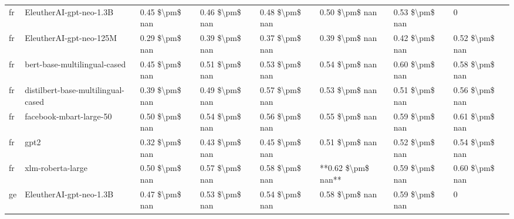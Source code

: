 \begin{tabular}{llllllll}
      fr &            EleutherAI-gpt-neo-1.3B & 0.45 \$\textbackslash pm\$ nan &            0.46 \$\textbackslash pm\$ nan &        0.48 \$\textbackslash pm\$ nan &         0.50 \$\textbackslash pm\$ nan &                          0.53 \$\textbackslash pm\$ nan &                  0 \\
      fr &            EleutherAI-gpt-neo-125M & 0.29 \$\textbackslash pm\$ nan &            0.39 \$\textbackslash pm\$ nan &        0.37 \$\textbackslash pm\$ nan &         0.39 \$\textbackslash pm\$ nan &                          0.42 \$\textbackslash pm\$ nan &     0.52 \$\textbackslash pm\$ nan \\
      fr &       bert-base-multilingual-cased & 0.45 \$\textbackslash pm\$ nan &            0.51 \$\textbackslash pm\$ nan &        0.53 \$\textbackslash pm\$ nan &         0.54 \$\textbackslash pm\$ nan &                          0.60 \$\textbackslash pm\$ nan &     0.58 \$\textbackslash pm\$ nan \\
      fr & distilbert-base-multilingual-cased & 0.39 \$\textbackslash pm\$ nan &            0.49 \$\textbackslash pm\$ nan &        0.57 \$\textbackslash pm\$ nan &         0.53 \$\textbackslash pm\$ nan &                          0.51 \$\textbackslash pm\$ nan &     0.56 \$\textbackslash pm\$ nan \\
      fr &            facebook-mbart-large-50 & 0.50 \$\textbackslash pm\$ nan &            0.54 \$\textbackslash pm\$ nan &        0.56 \$\textbackslash pm\$ nan &         0.55 \$\textbackslash pm\$ nan &                          0.59 \$\textbackslash pm\$ nan &     0.61 \$\textbackslash pm\$ nan \\
      fr &                               gpt2 & 0.32 \$\textbackslash pm\$ nan &            0.43 \$\textbackslash pm\$ nan &        0.45 \$\textbackslash pm\$ nan &         0.51 \$\textbackslash pm\$ nan &                          0.52 \$\textbackslash pm\$ nan &     0.54 \$\textbackslash pm\$ nan \\
      fr &                  xlm-roberta-large & 0.50 \$\textbackslash pm\$ nan &            0.57 \$\textbackslash pm\$ nan &        0.58 \$\textbackslash pm\$ nan &     **0.62 \$\textbackslash pm\$ nan** &                          0.59 \$\textbackslash pm\$ nan &     0.60 \$\textbackslash pm\$ nan \\
      ge &            EleutherAI-gpt-neo-1.3B & 0.47 \$\textbackslash pm\$ nan &            0.53 \$\textbackslash pm\$ nan &        0.54 \$\textbackslash pm\$ nan &         0.58 \$\textbackslash pm\$ nan &                          0.59 \$\textbackslash pm\$ nan &                  0 \\

\end{tabular}
